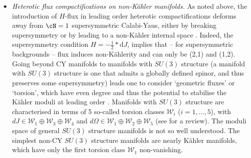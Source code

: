 \begin{itemize}
 \item \emph{Heterotic flux compactifications on non-K\"ahler manifolds.}  As noted above, the introduction of $H$-flux in leading order heterotic compactifications deforms away from $\cN=1$ supersymmetric Calabi-Yaus, either by breaking supersymmetry or by leading to a non-K\"ahler internal space \cite{Strominger:1986uh}.  Indeed, the supersymmetry condition $H=-\frac12*\textrm{d}J$, implies that -- for supersymmetric backgrounds -- flux induces non-K\"ahlerity and can only be (2,1) and (1,2).  Going beyond CY manifolds to manifolds with $SU(3)$ structure (a manifold with $SU(3)$ structure is one that admits a globally defined spinor, and thus preserves some supersymmetry) leads one to consider `geometric fluxes' or `torsion', which have even degree and thus the potential to stabilise the K\"ahler moduli at leading order \cite{Strominger:1986uh, LopesCardoso:2002vpf, Becker:2003sh, Becker:2003yv, Gauntlett:2003cy}.  Manifolds with $SU(3)$ structure are characterised in terms of 5 so-called torsion classes $\mathcal{W}_i$ ($i=1,\dots,5$), with $dJ \in \mathcal{W}_1 \oplus \mathcal{W}_3 \oplus \mathcal{W}_4$ and  $d\Omega \in \mathcal{W}_1 \oplus \mathcal{W}_2 \oplus \mathcal{W}_5$  (see \cite{Grana:2005jc} for a review).  The moduli space of general $SU(3)$ structure manifolds is not so well understood.  The simplest non-CY $SU(3)$ structure manifolds are nearly K\"ahler manifolds, which have only the first torsion class $\mathcal{W}_1$ non-vanishing.
 

\end{itemize}
